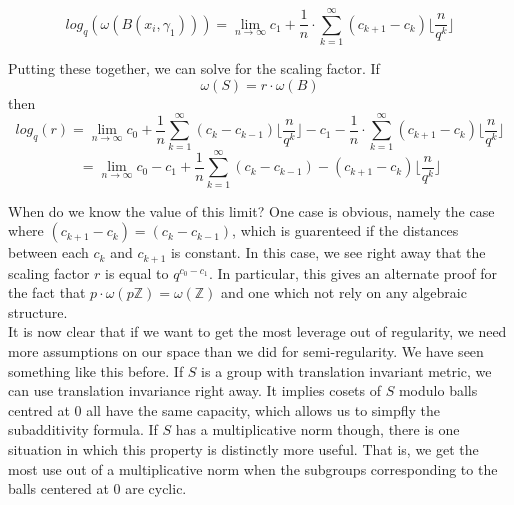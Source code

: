 \[log_q(\omega(B(x_i,\gamma_1))) = \lim_{n\to\infty} c_1 + \frac{1}{n}\cdot \sum_{k=1}^{\infty} (c_{k+1} - c_{k}) \lfloor \frac{n}{q^{k}}\rfloor\]

Putting these together, we can solve for the scaling factor.
If \[\omega(S) = r\cdot \omega(B)\] then
\[ log_q(r) = \lim_{n\to\infty} c_0 + \frac{1}{n} \sum_{k=1}^\infty (c_k - c_{k-1}) \lfloor \frac{n}{q^k} \rfloor -  c_1 - \frac{1}{n}\cdot \sum_{k=1}^{\infty} (c_{k+1} - c_{k}) \lfloor \frac{n}{q^{k}}\rfloor\]
\[ = \lim_{n\to\infty} c_0 -c_1 + \frac{1}{n} \sum_{k=1}^\infty (c_k - c_{k-1}) - (c_{k+1} - c_{k}) \lfloor \frac{n}{q^k} \rfloor \]

When do we know the value of this limit? One case is obvious, namely the case where $(c_{k+1} - c_{k}) = (c_{k} - c_{k-1})$, which is guarenteed if the distances between each $c_k$ and $c_{k+1}$ is constant. In this case, we see right away that the scaling factor $r$ is equal to $q^{c_0-c_1}$. In particular, this gives an alternate proof for the fact that $p \cdot \omega(p\mathbb{Z}) = \omega(\mathbb{Z})$ and one which not rely on any algebraic structure. \\

It is now clear that if we want to get the most leverage out of regularity, we need more assumptions on our space than we did for semi-regularity. We have seen something like this before. If $S$ is a group with translation invariant metric, we can use translation invariance right away. It implies cosets of $S$ modulo balls centred at $0$ all have the same capacity, which allows us to simpfly the subadditivity formula. If $S$ has a multiplicative norm though, there is one situation in which this property is distinctly more useful. That is, we get the most use out of a multiplicative norm when the subgroups corresponding to the balls centered at $0$ are cyclic.\\



